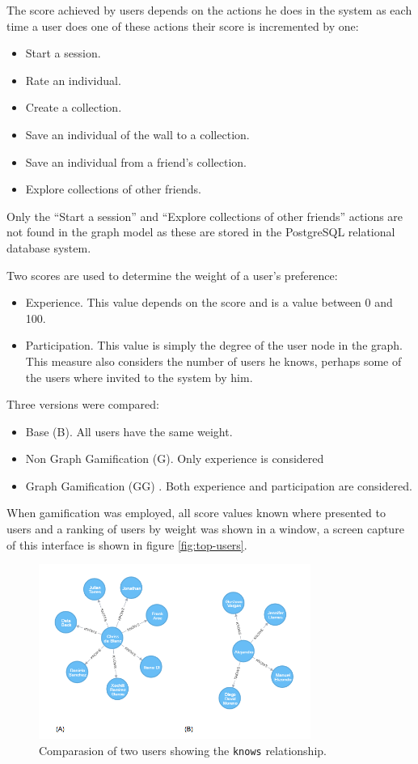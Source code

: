 \documentclass[conference]{IEEEtran}
\begin{document}
The score achieved by users depends on the actions he does in the system as
each time a user does one of these actions their score is incremented by one:
\begin{itemize}
\item Start a session.
\item Rate an individual.
\item Create a collection.
\item Save an individual of the wall to a collection.
\item Save an individual from a friend's collection.
\item Explore collections of other friends.
\end{itemize}

Only the ``Start a session'' and ``Explore collections of other friends'' actions 
are not found in the graph model as these are stored in the PostgreSQL relational
database system. 

Two scores are used to determine the weight of a user's preference:
\begin{itemize}
\item Experience. This value depends on the score and is a value 
between 0 and 100. 

\item Participation. This value is simply the degree of the user node 
in the graph. This measure also considers the number of users he knows,
perhaps some of the users where invited to the system by him.   
\end{itemize}

Three versions were compared:
\begin{itemize}
\item Base (B). All users have the same weight.
\item Non Graph Gamification (G). Only experience is considered
\item Graph Gamification (GG) . Both experience and participation are considered.
\end{itemize}
When gamification was employed, all score values known where presented to users
and a ranking of users by weight was shown in a window, a screen capture of
this interface is shown in figure \ref{fig:top-users}. 

\begin{figure}[!t]
    \centering
        \includegraphics[width=3.5in]{img/users_known_1.png}
    \caption{Comparasion of two users showing the {\tt knows} relationship.}
    \label{fig:users-graph}
\end{figure}
\end{document}
